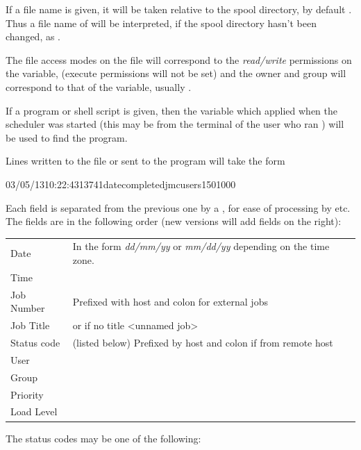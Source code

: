 If a file name is given, it will be taken relative to the spool directory, by default \spooldir. Thus a file name of 
will be interpreted, if the spool directory hasn't been changed, as \linebreak[24].

The file access modes on the file will correspond to the \textit{read/write} permissions on the variable, (execute permissions
will not be set) and the owner and group will correspond to that of the variable, usually \batchuser{}.

If a program or shell script is given, then the  variable which applied when the scheduler was started (this may be from
the terminal of the user who ran \BtstartName{}) will be used to find the program.

Lines written to the file or sent to the program will take the form

\begin{expara}

03/05/13{\textbar}10:22:43{\textbar}13741{\textbar}date{\textbar}completed{\textbar}jmc{\textbar}users{\textbar}150{\textbar}1000

\end{expara}

Each field is separated from the previous one by a {\textbar}, for ease of processing by  etc. The fields are in the following order (new
versions will add fields on the right):

\begin{center}
\begin{tabular}{l l}
Date & In the form \textit{dd/mm/yy} or \textit{mm/dd/yy} depending
on the time zone.\\
Time & ~ \\
Job Number & Prefixed with host and colon for external jobs\\
Job Title & or if no title {\textless}unnamed job{\textgreater}\\
Status code & (listed below) Prefixed by host and colon if from remote host\\
User & ~ \\
Group & ~ \\
Priority & ~ \\
Load Level & ~ \\
\end{tabular}
\end{center}
The status codes may be one of the following:

